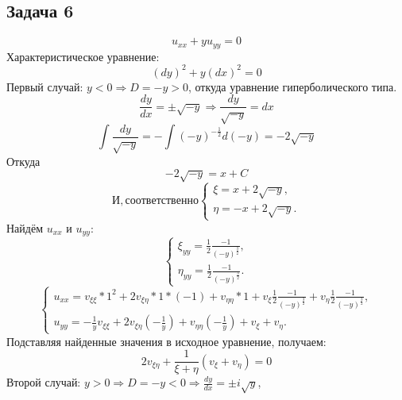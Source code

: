 \documentclass[11pt]{article}
\begin{document}
\subsection{Задача 6}
\label{sec:org6aa8ece}
\begin{equation}
u_{xx} + yu_{yy} = 0
\end{equation}
Характеристическое уравнение:
\begin{equation}
(dy)^2 + y(dx)^2 = 0
\end{equation}
Первый случай:
\(y < 0 \Rightarrow D = -y > 0\), откуда уравнение гиперболического типа.
\begin{equation*}
\frac{dy}{dx} = \pm\sqrt{-y} \Rightarrow \frac{dy}{\sqrt{-y}} = dx
\end{equation*}
\begin{equation*}
\int{\frac{dy}{\sqrt{-y}}} = -\int{(-y)^{-\frac12}}d(-y) = -2\sqrt{-y}
\end{equation*}
Откуда
\begin{equation*}
-2\sqrt{-y} = x + C
\end{equation*}
\begin{equation*}
И, соответственно
\begin{cases}
\xi = x + 2\sqrt{-y}, \\
\eta = -x + 2\sqrt{-y}.
\end{cases}
\end{equation*}
Найдём $u_{xx}$ и $u_{yy}$:
\begin{equation*}
\begin{cases}
\xi_{yy} = \frac12\frac{-1}{(-y)^{\frac32}}, \\
\eta_{yy} = \frac12\frac{-1}{(-y)^{\frac32}}.
\end{cases}
\end{equation*}
\begin{equation*}
\begin{cases}
u_{xx} = v_{\xi\xi}*1^2 + 2v_{\xi\eta}*1*(-1) + v_{\eta\eta}*1 + v_{\xi}\frac12\frac{-1}{(-y)^{\frac32}}
+ v_{\eta}\frac12\frac{-1}{(-y)^{\frac32}}, \\
u_{yy} = -\frac1yv_{\xi\xi} + 2v_{\xi\eta}\left(-\frac1y\right) + v_{\eta\eta}\left(-\frac1y\right)
+ v_{\xi} + v_{\eta}.
\end{cases}
\end{equation*}
Подставляя найденные значения в исходное уравнение, получаем:
\begin{equation}
2v_{\xi\eta} + \frac1{\xi + \eta}(v_{\xi} + v_{\eta}) = 0
\end{equation}
Второй случай: \(y > 0 \Rightarrow D = -y < 0 \Rightarrow \frac{dy}{dx} = \pm i\sqrt{y}\),
\end{document}
